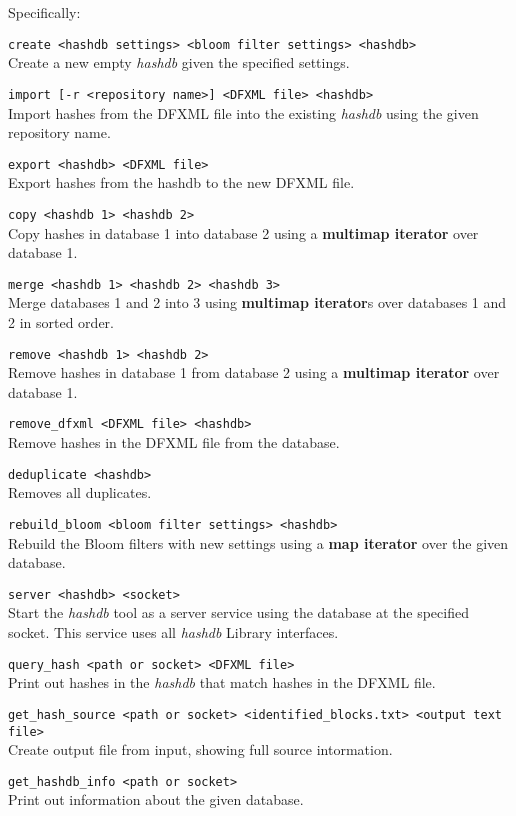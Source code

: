 \documentclass[12pt,twoside]{article}
\newcommand{\hdb}{\emph{hashdb}\xspace}
\newcommand{\mi}{\textbf{map iterator}\xspace}
\newcommand{\mmi}{\textbf{multimap iterator}\xspace}
\begin{document}
Specifically:
\begin{compactitem}
\item \texttt{create <hashdb settings> <bloom filter settings> <hashdb>} \\
Create a new empty \hdb given the specified settings.
\item \texttt{import [-r <repository name>] <DFXML file> <hashdb>} \\
Import hashes from the DFXML file into the existing \hdb
using the given repository name.
\item \texttt{export <hashdb> <DFXML file>} \\
Export hashes from the hashdb to the new DFXML file.
\item \texttt{copy <hashdb 1> <hashdb 2>} \\
Copy hashes in database 1 into database 2
using a \mmi over database 1.
\item \texttt{merge <hashdb 1> <hashdb 2> <hashdb 3>} \\
Merge databases 1 and 2 into 3
using {\mmi}s over databases 1 and 2 in sorted order.
\item \texttt{remove <hashdb 1> <hashdb 2>} \\
Remove hashes in database 1 from database 2
using a \mmi over database 1.
\item \texttt{remove\_dfxml <DFXML file> <hashdb>} \\
Remove hashes in the DFXML file from the database.
\item \texttt{deduplicate <hashdb>} \\
Removes all duplicates.
\item \texttt{rebuild\_bloom <bloom filter settings> <hashdb>} \\
Rebuild the Bloom filters with new settings
using a \mi over the given database.
\item \texttt{server <hashdb> <socket>} \\
Start the \hdb tool as a server service using the database
at the specified socket.
This service uses all \hdb Library interfaces.
\item \texttt{query\_hash <path or socket> <DFXML file>} \\
Print out hashes in the \hdb that match hashes in the DFXML file.
\item \texttt{get\_hash\_source <path or socket> <identified\_blocks.txt> <output text file>} \\
Create output file from input, showing full source intormation.
\item \texttt{get\_hashdb\_info <path or socket>} \\
Print out information about the given database.
\end{compactitem}
\end{document}
